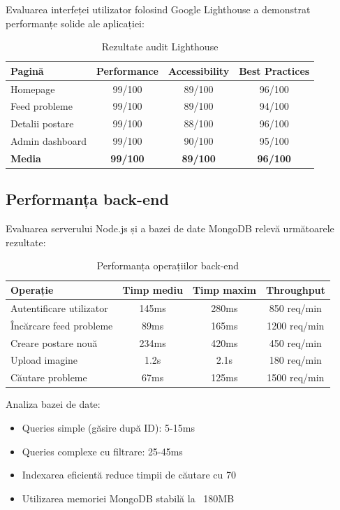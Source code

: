 \documentclass[12pt,a4paper]{report}
\begin{document}
Evaluarea interfeței utilizator folosind Google Lighthouse a demonstrat performanțe solide ale aplicației:

\begin{table}[H]
\centering
\caption{Rezultate audit Lighthouse}
\label{tab:lighthouse_results}
\begin{tabular}{|l|c|c|c|}
\hline
\textbf{Pagină} & \textbf{Performance} & \textbf{Accessibility} & \textbf{Best Practices} \\
\hline
Homepage & 99/100 & 89/100 & 96/100 \\
\hline
Feed probleme & 99/100 & 89/100 & 94/100 \\
\hline
Detalii postare & 99/100 & 88/100 & 96/100 \\
\hline
Admin dashboard & 99/100 & 90/100 & 95/100 \\
\hline
\textbf{Media} & \textbf{99/100} & \textbf{89/100} & \textbf{96/100} \\
\hline
\end{tabular}
\end{table}


\subsection{Performanța back-end}

Evaluarea serverului Node.js și a bazei de date MongoDB relevă următoarele rezultate:

\begin{table}[H]
\centering
\caption{Performanța operațiilor back-end}
\label{tab:backend_performance}
\begin{tabular}{|l|c|c|c|}
\hline
\textbf{Operație} & \textbf{Timp mediu} & \textbf{Timp maxim} & \textbf{Throughput} \\
\hline
Autentificare utilizator & 145ms & 280ms & 850 req/min \\
\hline
Încărcare feed probleme & 89ms & 165ms & 1200 req/min \\
\hline
Creare postare nouă & 234ms & 420ms & 450 req/min \\
\hline
Upload imagine & 1.2s & 2.1s & 180 req/min \\
\hline
Căutare probleme & 67ms & 125ms & 1500 req/min \\
\hline
\end{tabular}
\end{table}

Analiza bazei de date:
\begin{itemize}
\item Queries simple (găsire după ID): 5-15ms
\item Queries complexe cu filtrare: 25-45ms
\item Indexarea eficientă reduce timpii de căutare cu 70%
\item Utilizarea memoriei MongoDB stabilă la ~180MB
\end{itemize}
\end{document}
